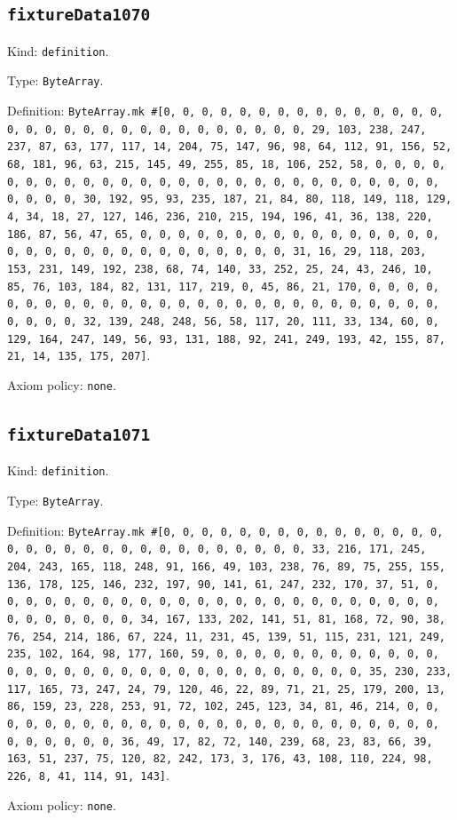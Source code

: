 \documentclass[11pt]{article}
\begin{document}
\subsection*{\texttt{fixtureData1070}}
\noindent Kind: \texttt{definition}.\par
\noindent Type: \texttt{ByteArray}.\par
\noindent Definition: \texttt{ByteArray.mk \#[0, 0, 0, 0, 0, 0, 0, 0, 0, 0, 0, 0, 0, 0, 0, 0, 0, 0, 0, 0, 0, 0, 0, 0, 0, 0, 0, 0, 0, 0, 0, 29, 103, 238, 247, 237, 87, 63, 177, 117, 14, 204, 75, 147, 96, 98, 64, 112, 91, 156, 52, 68, 181, 96, 63, 215, 145, 49, 255, 85, 18, 106, 252, 58, 0, 0, 0, 0, 0, 0, 0, 0, 0, 0, 0, 0, 0, 0, 0, 0, 0, 0, 0, 0, 0, 0, 0, 0, 0, 0, 0, 0, 0, 0, 0, 30, 192, 95, 93, 235, 187, 21, 84, 80, 118, 149, 118, 129, 4, 34, 18, 27, 127, 146, 236, 210, 215, 194, 196, 41, 36, 138, 220, 186, 87, 56, 47, 65, 0, 0, 0, 0, 0, 0, 0, 0, 0, 0, 0, 0, 0, 0, 0, 0, 0, 0, 0, 0, 0, 0, 0, 0, 0, 0, 0, 0, 0, 0, 0, 31, 16, 29, 118, 203, 153, 231, 149, 192, 238, 68, 74, 140, 33, 252, 25, 24, 43, 246, 10, 85, 76, 103, 184, 82, 131, 117, 219, 0, 45, 86, 21, 170, 0, 0, 0, 0, 0, 0, 0, 0, 0, 0, 0, 0, 0, 0, 0, 0, 0, 0, 0, 0, 0, 0, 0, 0, 0, 0, 0, 0, 0, 0, 0, 32, 139, 248, 248, 56, 58, 117, 20, 111, 33, 134, 60, 0, 129, 164, 247, 149, 56, 93, 131, 188, 92, 241, 249, 193, 42, 155, 87, 21, 14, 135, 175, 207]}.\par
\noindent Axiom policy: \texttt{none}.\par
\subsection*{\texttt{fixtureData1071}}
\noindent Kind: \texttt{definition}.\par
\noindent Type: \texttt{ByteArray}.\par
\noindent Definition: \texttt{ByteArray.mk \#[0, 0, 0, 0, 0, 0, 0, 0, 0, 0, 0, 0, 0, 0, 0, 0, 0, 0, 0, 0, 0, 0, 0, 0, 0, 0, 0, 0, 0, 0, 0, 33, 216, 171, 245, 204, 243, 165, 118, 248, 91, 166, 49, 103, 238, 76, 89, 75, 255, 155, 136, 178, 125, 146, 232, 197, 90, 141, 61, 247, 232, 170, 37, 51, 0, 0, 0, 0, 0, 0, 0, 0, 0, 0, 0, 0, 0, 0, 0, 0, 0, 0, 0, 0, 0, 0, 0, 0, 0, 0, 0, 0, 0, 0, 0, 34, 167, 133, 202, 141, 51, 81, 168, 72, 90, 38, 76, 254, 214, 186, 67, 224, 11, 231, 45, 139, 51, 115, 231, 121, 249, 235, 102, 164, 98, 177, 160, 59, 0, 0, 0, 0, 0, 0, 0, 0, 0, 0, 0, 0, 0, 0, 0, 0, 0, 0, 0, 0, 0, 0, 0, 0, 0, 0, 0, 0, 0, 0, 0, 35, 230, 233, 117, 165, 73, 247, 24, 79, 120, 46, 22, 89, 71, 21, 25, 179, 200, 13, 86, 159, 23, 228, 253, 91, 72, 102, 245, 123, 34, 81, 46, 214, 0, 0, 0, 0, 0, 0, 0, 0, 0, 0, 0, 0, 0, 0, 0, 0, 0, 0, 0, 0, 0, 0, 0, 0, 0, 0, 0, 0, 0, 0, 0, 36, 49, 17, 82, 72, 140, 239, 68, 23, 83, 66, 39, 163, 51, 237, 75, 120, 82, 242, 173, 3, 176, 43, 108, 110, 224, 98, 226, 8, 41, 114, 91, 143]}.\par
\noindent Axiom policy: \texttt{none}.\par
\end{document}
